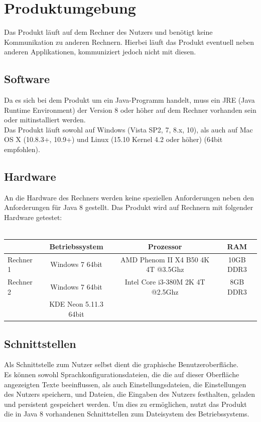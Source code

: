 \documentclass[parskip=full]{scrartcl}
\begin{document}
 

\section{Produktumgebung}
Das Produkt läuft auf dem Rechner des Nutzers und benötigt keine Kommunikation zu anderen Rechnern. Hierbei läuft das Produkt eventuell neben anderen Applikationen, kommuniziert jedoch nicht mit diesen.

\subsection{Software}
Da es sich bei dem Produkt um ein Java-Programm handelt, muss ein JRE (Java Runtime Environment) der Version 8 oder höher auf dem Rechner vorhanden sein oder mitinstalliert werden. \\
Das Produkt läuft sowohl auf Windows (Vista SP2, 7, 8.x, 10), als auch auf Mac OS X (10.8.3+, 10.9+) und Linux (15.10 Kernel 4.2 oder höher) (64bit empfohlen).

\subsection{Hardware}
An die Hardware des Rechners werden keine speziellen Anforderungen neben den Anforderungen für Java 8 gestellt. Das Produkt wird auf Rechnern mit folgender Hardware getestet: \\ \\
\begin{tabular}{l||c|c|c}
   	& Betriebssystem & Prozessor & RAM \\
	\hline
	\hline
	Rechner 1 & Windows 7 64bit & AMD Phenom II X4 B50 4K 4T @3.5Ghz & 10GB DDR3 \\
	Rechner 2 & Windows 7 64bit & Intel Core i3-380M 2K 4T @2.5Ghz & 8GB DDR3 \\
	 & KDE Neon 5.11.3 64bit &  \\
\end{tabular}

\subsection{Schnittstellen}
Als Schnittstelle zum Nutzer selbst dient die graphische Benutzeroberfläche. \\ Es können sowohl Sprachkonfigurationsdateien, die die auf dieser Oberfläche angezeigten Texte beeinflussen, als auch Einstellungsdateien, die Einstellungen des Nutzers speichern, und Dateien, die Eingaben des Nutzers festhalten, geladen und persistent gespeichert werden. Um dies zu ermöglichen, nutzt das Produkt die in Java 8 vorhandenen Schnittstellen zum Dateisystem des Betriebssystems. 
\end{document}
